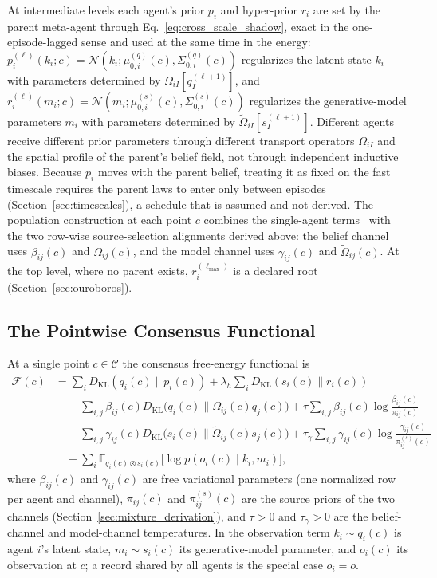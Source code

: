 \documentclass[11pt]{article}
\begin{document}
At intermediate levels each agent's prior $p_i$ and hyper-prior $r_i$ are set by the parent meta-agent through Eq.~\eqref{eq:cross_scale_shadow}, exact in the one-episode-lagged sense and used at the same time in the energy: $p_i^{(\ell)}(k_i; c) = \mathcal{N}(k_i; \mu_{0,i}^{(q)}(c), \Sigma_{0,i}^{(q)}(c))$ regularizes the latent state $k_i$ with parameters determined by $\Omega_{iI}[q_I^{(\ell+1)}]$, and $r_i^{(\ell)}(m_i; c) = \mathcal{N}(m_i; \mu_{0,i}^{(s)}(c), \Sigma_{0,i}^{(s)}(c))$ regularizes the generative-model parameters $m_i$ with parameters determined by $\tilde\Omega_{iI}[s_I^{(\ell+1)}]$. Different agents receive different prior parameters through different transport operators $\Omega_{iI}$ and the spatial profile of the parent's belief field, not through independent inductive biases. Because $p_i$ moves with the parent belief, treating it as fixed on the fast timescale requires the parent laws to enter only between episodes (Section~\ref{sec:timescales}), a schedule that is assumed and not derived. The population construction at each point $c$ combines the single-agent terms~\cite{Friston2010, parr2022active} with the two row-wise source-selection alignments derived above: the belief channel uses $\beta_{ij}(c)$ and $\Omega_{ij}(c)$, and the model channel uses $\gamma_{ij}(c)$ and $\tilde{\Omega}_{ij}(c)$. At the top level, where no parent exists, $r_i^{(\ell_{\max})}$ is a declared root (Section~\ref{sec:ouroboros}).

\subsection{The Pointwise Consensus Functional}

At a single point $c \in \mathcal{C}$ the consensus free-energy functional is
\begin{equation}
\begin{aligned}
\mathcal{F}(c) &= \sum_i D_{\mathrm{KL}}(q_i(c) \| p_i(c)) + \lambda_h \sum_i D_{\mathrm{KL}}(s_i(c) \| r_i(c)) \\
&\quad + \sum_{i,j} \beta_{ij}(c) D_{\mathrm{KL}}\big(q_i(c) \big\| \Omega_{ij}(c)q_j(c)\big) + \tau \sum_{i,j} \beta_{ij}(c) \log\frac{\beta_{ij}(c)}{\pi_{ij}(c)} \\
&\quad + \sum_{i,j} \gamma_{ij}(c) D_{\mathrm{KL}}\big(s_i(c) \big\| \tilde{\Omega}_{ij}(c)s_j(c)\big) + \tau_\gamma \sum_{i,j} \gamma_{ij}(c) \log\frac{\gamma_{ij}(c)}{\pi^{(s)}_{ij}(c)} \\
&\quad - \sum_i \mathbb{E}_{q_i(c) \otimes s_i(c)}\big[\log p(o_i(c) \mid k_i, m_i)\big],
\end{aligned}
\label{eq:pointwise_free_energy}
\end{equation}
where $\beta_{ij}(c)$ and $\gamma_{ij}(c)$ are free variational parameters (one normalized row per agent and channel), $\pi_{ij}(c)$ and $\pi^{(s)}_{ij}(c)$ are the source priors of the two channels (Section~\ref{sec:mixture_derivation}), and $\tau > 0$ and $\tau_\gamma > 0$ are the belief-channel and model-channel temperatures. In the observation term $k_i \sim q_i(c)$ is agent $i$'s latent state, $m_i \sim s_i(c)$ its generative-model parameter, and $o_i(c)$ its observation at $c$; a record shared by all agents is the special case $o_i = o$.
\end{document}
